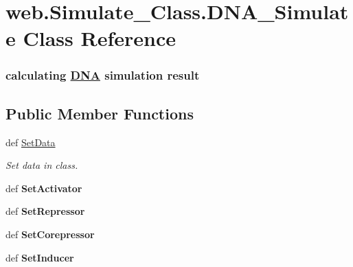 \hypertarget{classweb_1_1_simulate___class_1_1_d_n_a___simulate}{\section{web.\-Simulate\-\_\-\-Class.\-D\-N\-A\-\_\-\-Simulate Class Reference}
\label{classweb_1_1_simulate___class_1_1_d_n_a___simulate}
}


\subsubsection*{calculating \hyperlink{class_d_n_a}{D\-N\-A} simulation result } 


\subsection*{Public Member Functions}
\begin{DoxyCompactItemize}
\item 
def \hyperlink{classweb_1_1_simulate___class_1_1_d_n_a___simulate_a06ff5bd8c89a820405d937a5f8a837f3}{Set\-Data}
\begin{DoxyCompactList}\small\item\em Set data in class. \end{DoxyCompactList}\item 
\hypertarget{classweb_1_1_simulate___class_1_1_d_n_a___simulate_ad17aed6fe820df86a76eae9e307c6fbc}{def {\bfseries Set\-Activator}}\label{classweb_1_1_simulate___class_1_1_d_n_a___simulate_ad17aed6fe820df86a76eae9e307c6fbc}

\item 
\hypertarget{classweb_1_1_simulate___class_1_1_d_n_a___simulate_af3ad470a356961ff4019e740f813e321}{def {\bfseries Set\-Repressor}}\label{classweb_1_1_simulate___class_1_1_d_n_a___simulate_af3ad470a356961ff4019e740f813e321}

\item 
\hypertarget{classweb_1_1_simulate___class_1_1_d_n_a___simulate_a467aabf0e04b68c0b813931ffdfbd86c}{def {\bfseries Set\-Corepressor}}\label{classweb_1_1_simulate___class_1_1_d_n_a___simulate_a467aabf0e04b68c0b813931ffdfbd86c}

\item 
\hypertarget{classweb_1_1_simulate___class_1_1_d_n_a___simulate_ad7ed3917ea1662b7d8ebded6ae6c9275}{def {\bfseries Set\-Inducer}}\label{classweb_1_1_simulate___class_1_1_d_n_a___simulate_ad7ed3917ea1662b7d8ebded6ae6c9275}

\end{DoxyCompactItemize}
